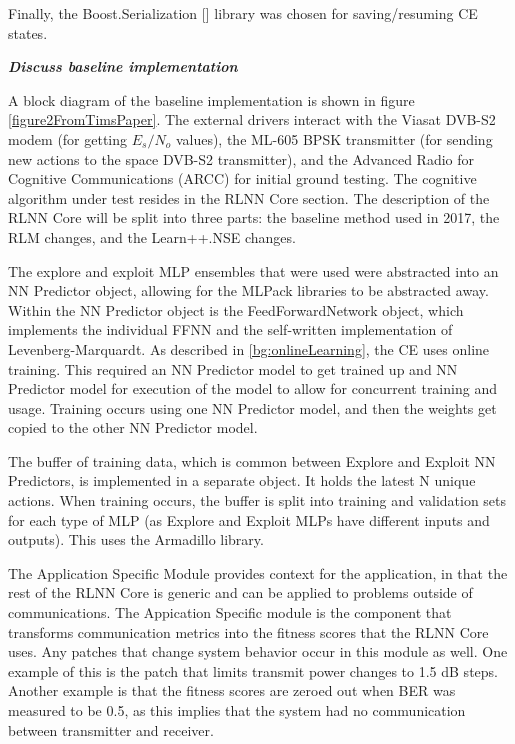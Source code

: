 \par Finally, the Boost.Serialization [\cite{cite_boostSerial_lol}] library was chosen for saving/resuming CE states. 
\par\textbf{\textit{Discuss baseline implementation}} 
\par A block diagram of the baseline implementation is shown in figure \ref{figure2FromTimsPaper}. The external drivers interact with the Viasat DVB-S2 modem (for getting $E_s/N_o$ values), the ML-605 BPSK transmitter (for sending new actions to the space DVB-S2 transmitter), and the Advanced Radio for Cognitive Communications (ARCC) for initial ground testing. The cognitive algorithm under test resides in the RLNN Core section. The description of the RLNN Core will be split into three parts: the baseline method used in 2017, the RLM changes, and the Learn++.NSE changes.
\par The explore and exploit MLP ensembles that were used were abstracted into an NN Predictor object, allowing for the MLPack libraries to be abstracted away. Within the NN Predictor object is the FeedForwardNetwork object, which implements the individual FFNN and the self-written implementation of Levenberg-Marquardt. As described in \ref{bg:onlineLearning}, the CE uses online training. This required an NN Predictor model to get trained up and NN Predictor model for execution of the model to allow for concurrent training and usage. Training occurs using one NN Predictor model, and then the weights get copied to the other NN Predictor model. 
\par The buffer of training data, which is common between Explore and Exploit NN Predictors, is implemented in a separate object. It holds the latest N unique actions. When training occurs, the buffer is split into training and validation sets for each type of MLP (as Explore and Exploit MLPs have different inputs and outputs). This uses the Armadillo library.
\par The Application Specific Module provides context for the application, in that the rest of the RLNN Core is generic and can be applied to problems outside of communications. The Appication Specific module is the component that transforms communication metrics into the fitness scores that the RLNN Core uses. Any patches that change system behavior occur in this module as well. One example of this is the patch that limits transmit power changes to 1.5 dB steps. Another example is that the fitness scores are zeroed out when BER was measured to be 0.5, as this implies that the system had no communication between transmitter and receiver. 
